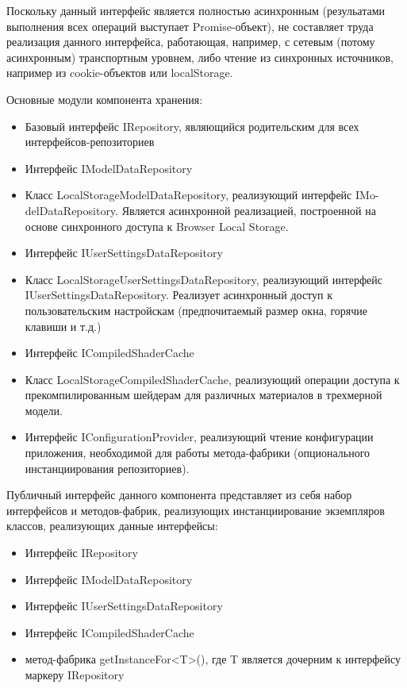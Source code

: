 Поскольку данный интерфейс является полностью асинхронным (резульатами выполнения всех операций выступает Promise-объект), не составляет труда реализация данного интерфейса, работающая, например, с
сетевым (потому асинхронным) транспортным уровнем, либо чтение из синхронных источников, например из cookie-объектов или localStorage. 

Основные модули компонента хранения:
\begin{itemize}
\item Базовый интерфейс IRepository, являющийся родительским для всех интерфейсов-репозиториев
\item Интерфейс IModelDataRepository
\item Класс LocalStorageModelDataRepository, реализующий интерфейс IMo-delDataRepository. Является асинхронной реализацией, построенной на основе синхронного доступа к Browser Local Storage.
\item Интерфейс IUserSettingsDataRepository
\item Класс LocalStorageUserSettingsDataRepository, реализующий интерфейс IUserSettingsDataRepository. Реализует асинхронный доступ к пользовательским настройскам (предпочитаемый размер окна,
горячие клавиши и т.д.)
\item Интерфейс ICompiledShaderCache
\item Класс LocalStorageCompiledShaderCache, реализующий операции доступа к прекомпилированным шейдерам для различных материалов в трехмерной модели.
\item Интерфейс IConfigurationProvider, реализующий чтение конфигурации приложения, необходимой для работы метода-фабрики (опционального инстанциирования репозиториев).
\end{itemize}

Публичный интерфейс данного компонента представляет из себя набор интерфейсов и методов-фабрик, реализующих инстанциирование экземпляров классов, реализующих данные интерфейсы:
\begin{itemize}
\item Интерфейс IRepository
\item Интерфейс IModelDataRepository
\item Интерфейс IUserSettingsDataRepository
\item Интерфейс ICompiledShaderCache
\item метод-фабрика getInstanceFor<T>(), где T является дочерним к интерфейсу маркеру IRepository
\end{itemize}